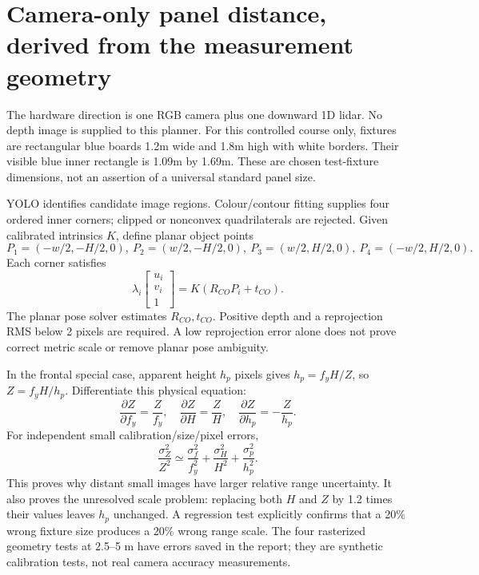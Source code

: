 \section{Camera-only panel distance, derived from the measurement geometry}
The hardware direction is one RGB camera plus one downward 1D lidar. No depth
image is supplied to this planner. For this controlled course only, fixtures
are rectangular blue boards 1.2m wide and 1.8m high with white borders. Their
visible blue inner rectangle is 1.09m by 1.69m. These are chosen test-fixture
dimensions, not an assertion of a universal standard panel size.

YOLO identifies candidate image regions. Colour/contour fitting supplies four
ordered inner corners; clipped or nonconvex quadrilaterals are rejected. Given
calibrated intrinsics $K$, define planar object points
\begin{equation}
P_1=(-w/2,-H/2,0),\ P_2=(w/2,-H/2,0),\
P_3=(w/2,H/2,0),\ P_4=(-w/2,H/2,0).
\end{equation}
Each corner satisfies
\begin{equation}
\lambda_i\begin{bmatrix}u_i\\v_i\\1\end{bmatrix}=K(R_{CO}P_i+t_{CO}).
\end{equation}
The planar pose solver estimates $R_{CO},t_{CO}$. Positive depth and a
reprojection RMS below 2 pixels are required. A low reprojection error alone
does not prove correct metric scale or remove planar pose ambiguity.

In the frontal special case, apparent height $h_p$ pixels gives
$h_p=f_yH/Z$, so $Z=f_yH/h_p$. Differentiate this physical equation:
\begin{equation}
\frac{\partial Z}{\partial f_y}=\frac Z{f_y},\quad
\frac{\partial Z}{\partial H}=\frac ZH,\quad
\frac{\partial Z}{\partial h_p}=-\frac Z{h_p}.
\end{equation}
For independent small calibration/size/pixel errors,
\begin{equation}
\frac{\sigma_Z^2}{Z^2}\simeq
\frac{\sigma_f^2}{f_y^2}+\frac{\sigma_H^2}{H^2}+\frac{\sigma_p^2}{h_p^2}.
\end{equation}
This proves why distant small images have larger relative range uncertainty.
It also proves the unresolved scale problem: replacing both $H$ and $Z$ by
1.2 times their values leaves $h_p$ unchanged. A regression test explicitly
confirms that a 20\% wrong fixture size produces a 20\% wrong range scale.
The four rasterized geometry tests at 2.5--5 m have errors saved in the report;
they are synthetic calibration tests, not real camera accuracy measurements.

